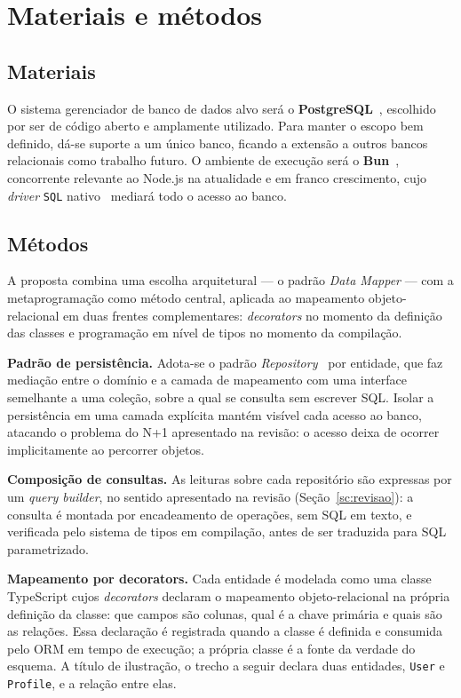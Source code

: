 \newpage
\section{Materiais e métodos}
\label{sc:materias_e_metodos}

\subsection{Materiais}
\label{sc:materiais}

O sistema gerenciador de banco de dados alvo será o \textbf{PostgreSQL}~\cite{postgresql}, escolhido por ser de código aberto e amplamente utilizado. Para manter o escopo bem definido, dá-se suporte a um único banco, ficando a extensão a outros bancos relacionais como trabalho futuro. O ambiente de execução será o \textbf{Bun}~\cite{bun}, concorrente relevante ao Node.js na atualidade e em franco crescimento, cujo \emph{driver} \texttt{SQL} nativo~\cite{bun-sql} mediará todo o acesso ao banco.

\subsection{Métodos}
\label{sc:metodos}

A proposta combina uma escolha arquitetural --- o padrão \emph{Data Mapper} --- com a metaprogramação como método central, aplicada ao mapeamento objeto-relacional em duas frentes complementares: \emph{decorators} no momento da definição das classes e programação em nível de tipos no momento da compilação.

\textbf{Padrão de persistência.} Adota-se o padrão \emph{Repository}~\cite[p.~309]{fowler} por entidade, que faz mediação entre o domínio e a camada de mapeamento com uma interface semelhante a uma coleção, sobre a qual se consulta sem escrever SQL. Isolar a persistência em uma camada explícita mantém visível cada acesso ao banco, atacando o problema do N+1 apresentado na revisão: o acesso deixa de ocorrer implicitamente ao percorrer objetos.

\textbf{Composição de consultas.} As leituras sobre cada repositório são expressas por um \emph{query builder}, no sentido apresentado na revisão (Seção~\ref{sc:revisao}): a consulta é montada por encadeamento de operações, sem SQL em texto, e verificada pelo sistema de tipos em compilação, antes de ser traduzida para SQL parametrizado.

\textbf{Mapeamento por decorators.} Cada entidade é modelada como uma classe TypeScript cujos \emph{decorators} declaram o mapeamento objeto-relacional na própria definição da classe: que campos são colunas, qual é a chave primária e quais são as relações. Essa declaração é registrada quando a classe é definida e consumida pelo ORM em tempo de execução; a própria classe é a fonte da verdade do esquema. A título de ilustração, o trecho a seguir declara duas entidades, \texttt{User} e \texttt{Profile}, e a relação entre elas.

